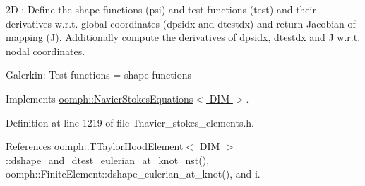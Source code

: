 2D \+: Define the shape functions (psi) and test functions (test) and their derivatives w.\+r.\+t. global coordinates (dpsidx and dtestdx) and return Jacobian of mapping (J). Additionally compute the derivatives of dpsidx, dtestdx and J w.\+r.\+t. nodal coordinates.

Galerkin\+: Test functions = shape functions 

Implements \hyperlink{classoomph_1_1NavierStokesEquations_afbc63afd804f5143c74b0ca1be76ef82}{oomph\+::\+Navier\+Stokes\+Equations$<$ D\+I\+M $>$}.



Definition at line 1219 of file Tnavier\+\_\+stokes\+\_\+elements.\+h.



References oomph\+::\+T\+Taylor\+Hood\+Element$<$ D\+I\+M $>$\+::dshape\+\_\+and\+\_\+dtest\+\_\+eulerian\+\_\+at\+\_\+knot\+\_\+nst(), oomph\+::\+Finite\+Element\+::dshape\+\_\+eulerian\+\_\+at\+\_\+knot(), and i.

\mbox{\label{classoomph_1_1TTaylorHoodElement_af289723f650d3a19a59a8337b6667c45}} 
